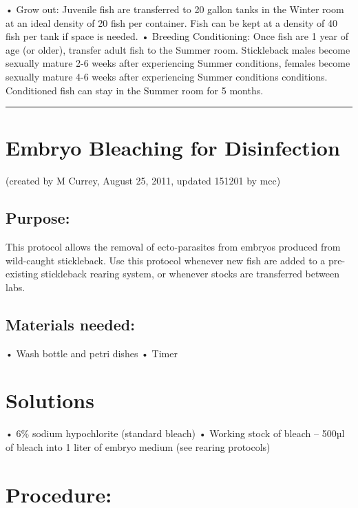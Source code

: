 \documentclass[
]{book}
\begin{document}
• Grow out: Juvenile fish are transferred to 20 gallon tanks in the Winter room at an ideal density of 20 fish per container. Fish can be kept at a density of 40 fish per tank if space is needed.
• Breeding Conditioning: Once fish are 1 year of age (or older), transfer adult fish to the Summer room. Stickleback males become sexually mature 2-6 weeks after experiencing Summer conditions, females become sexually mature 4-6 weeks after experiencing Summer conditions conditions. Conditioned fish can stay in the Summer room for 5 months.

\begin{center}\rule{0.5\linewidth}{0.5pt}\end{center}

\hypertarget{embryo-bleaching-for-disinfection}{%
\section{Embryo Bleaching for Disinfection}\label{embryo-bleaching-for-disinfection}}

(created by M Currey, August 25, 2011, updated 151201 by mcc)

\hypertarget{purpose}{%
\subsection{Purpose:}\label{purpose}}

This protocol allows the removal of ecto-parasites from embryos produced from wild-caught stickleback. Use this protocol whenever new fish are added to a pre-existing stickleback rearing system, or whenever stocks are transferred between labs.

\hypertarget{materials-needed}{%
\subsection{Materials needed:}\label{materials-needed}}

• Wash bottle and petri dishes
• Timer

\hypertarget{solutions}{%
\section{Solutions}\label{solutions}}

• 6\% sodium hypochlorite (standard bleach)
• Working stock of bleach -- 500µl of bleach into 1 liter of embryo medium (see rearing protocols)

\hypertarget{procedure}{%
\section{Procedure:}\label{procedure}}
\end{document}
